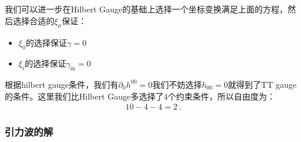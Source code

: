 我们可以进一步在Hilbert Gauge的基础上选择一个坐标变换满足上面的方程，然后选择合适的$ \xi_\mu $保证：
\begin{itemize}
  \item $ \xi_0 $的选择保证$ \gamma = 0 $
  \item $ \xi_i $的选择保证$ \gamma_{0i} = 0 $
\end{itemize}
根据hilbert gauge条件，我们有$ \partial_{0}h^{00} = 0 $我们不妨选择$ h_{00} = 0 $就得到了TT gauge的条件。这里我们比Hilbert Gauge多选择了4个约束条件，所以自由度为：
\begin{align}
  10 - 4 - 4 = 2\mathrm{~.}
\end{align}

\subsubsection{引力波的解}

\bigskip
{}


